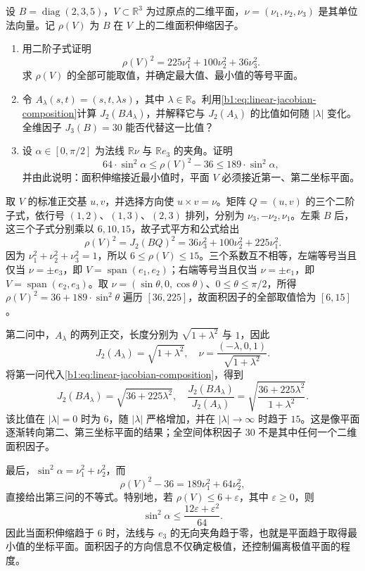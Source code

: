 \begin{exercise}\label{b1:ex:17-composition-tangent-factor}
设 \(B=\operatorname{diag}(2,3,5)\)，\(V\subset\mathbb R^3\) 为过原点的二维平面，\(\nu=(\nu_1,\nu_2,\nu_3)\) 是其单位法向量。记 \(\rho(V)\) 为 \(B\) 在 \(V\) 上的二维面积伸缩因子。
\begin{enumerate}
\item\label{b1:item:17-composition-restriction}
用二阶子式证明
\[
 \rho(V)^2=225\nu_1^2+100\nu_2^2+36\nu_3^2.
\]
求 \(\rho(V)\) 的全部可能取值，并确定最大值、最小值的等号平面。
\item\label{b1:item:17-composition-false-scalar}
令 \(A_\lambda(s,t)=(s,t,\lambda s)\)，其中 \(\lambda\in\mathbb R\)。利用\eqref{b1:eq:linear-jacobian-composition}计算 \(J_2(BA_\lambda)\)，并解释它与 \(J_2(A_\lambda)\) 的比值如何随 \(|\lambda|\) 变化。全维因子 \(J_3(B)=30\) 能否代替这一比值？
\item\label{b1:item:17-composition-near-extremizer}
设 \(\alpha\in[0,\pi/2]\) 为法线 \(\mathbb R\nu\) 与 \(\mathbb R e_3\) 的夹角。证明
\[
 64\cdot \sin^2\alpha\le\rho(V)^2-36\le189\cdot \sin^2\alpha,
\]
并由此说明：面积伸缩接近最小值时，平面 \(V\) 必须接近第一、第二坐标平面。
\end{enumerate}
\end{exercise}
\begin{solution}
取 \(V\) 的标准正交基 \(u,v\)，并选择方向使 \(u\times v=\nu\)。矩阵 \(Q=(u,v)\) 的三个二阶子式，依行号 \((1,2)\)、\((1,3)\)、\((2,3)\) 排列，分别为 \(\nu_3,-\nu_2,\nu_1\)。左乘 \(B\) 后，这三个子式分别乘以 \(6,10,15\)，故子式平方和公式给出
\[
 \rho(V)^2=J_2(BQ)^2
 =36\nu_3^2+100\nu_2^2+225\nu_1^2.
\]
因为 \(\nu_1^2+\nu_2^2+\nu_3^2=1\)，所以 \(6\le\rho(V)\le15\)。三个系数互不相等，左端等号当且仅当 \(\nu=\pm e_3\)，即 \(V=\operatorname{span}(e_1,e_2)\)；右端等号当且仅当 \(\nu=\pm e_1\)，即 \(V=\operatorname{span}(e_2,e_3)\)。取 \(\nu=(\sin\theta,0,\cos\theta)\)、\(0\le\theta\le\pi/2\)，所得 \(\rho(V)^2=36+189\cdot \sin^2\theta\) 遍历 \([36,225]\)，故面积因子的全部取值恰为 \([6,15]\)。

第二问中，\(A_\lambda\) 的两列正交，长度分别为 \(\sqrt{1+\lambda^2}\) 与 \(1\)，因此
\[
 J_2(A_\lambda)=\sqrt{1+\lambda^2},
 \quad \nu=\frac{(-\lambda,0,1)}{\sqrt{1+\lambda^2}}.
\]
将第一问代入\eqref{b1:eq:linear-jacobian-composition}，得到
\[
 J_2(BA_\lambda)=\sqrt{36+225\lambda^2},
 \quad \frac{J_2(BA_\lambda)}{J_2(A_\lambda)}
 =\sqrt{\frac{36+225\lambda^2}{1+\lambda^2}}.
\]
该比值在 \(|\lambda|=0\) 时为 \(6\)，随 \(|\lambda|\) 严格增加，并在 \(|\lambda|\to\infty\) 时趋于 \(15\)。这是像平面逐渐转向第二、第三坐标平面的结果；全空间体积因子 \(30\) 不是其中任何一个二维面积因子。

最后，\(\sin^2\alpha=\nu_1^2+\nu_2^2\)，而
\[
 \rho(V)^2-36=189\nu_1^2+64\nu_2^2,
\]
直接给出第三问的不等式。特别地，若 \(\rho(V)\le6+\varepsilon\)，其中 \(\varepsilon\ge0\)，则
\[
 \sin^2\alpha\le\frac{12\varepsilon+\varepsilon^2}{64}.
\]
因此当面积伸缩趋于 \(6\) 时，法线与 \(e_3\) 的无向夹角趋于零，也就是平面趋于取得最小值的坐标平面。面积因子的方向信息不仅确定极值，还控制偏离极值平面的程度。
\end{solution}

